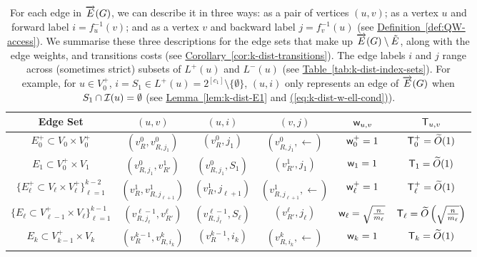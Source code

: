 \documentclass{article}
\newcommand{\eq}[1]{\hyperref[eq:#1]{(\ref*{eq:#1})}}
\newcommand{\lem}[1]{\hyperref[lem:#1]{Lemma~\ref*{lem:#1}}}
\newcommand{\cor}[1]{\hyperref[cor:#1]{Corollary~\ref*{cor:#1}}}
\newcommand{\tabl}[1]{\hyperref[tab:#1]{Table~\ref*{tab:#1}}}
\newcommand{\defin}[1]{\hyperref[def:#1]{Definition~\ref*{def:#1}}}
\renewcommand{\>}{\rangle}
\newcommand{\<}{\langle}
\renewcommand{\(}{\left(}
\renewcommand{\)}{\right)}
\def\w{{\sf w}}
\begin{document}
\begin{table}
	\renewcommand{\arraystretch}{1.5}
	\centering
	\begin{tabular}{ |c|c|c|c|c|c| }
		\hline
		Edge Set & $(u,v)$ & $(u,i)$ & $(v,j)$ & $\w_{u,v}$ & ${\sf T}_{u,v}$\\
		\hline
		\hline
		$E_0^+\subset V_0\times V_0^+$ & $(v^0_R,v^0_{R,j_1})$ & $(v^0_R,j_1)$ & $(v^0_{R,j_1},\leftarrow) $  & $\w_0^+=1$ & ${\sf T}_0^+=\widetilde{O}(1)$\\
		\hline
		$E_1\subset V_0^+\times V_1$ & $(v^0_{R,j_1},v^1_{R'})$ & $(v^0_{R,j_1},S_1)$ & $(v^1_{R'},j_1) $  & $\w_1=1$ & ${\sf T}_1=\widetilde{O}(1)$\\
		\hline
		$\{E_\ell^+\subset V_{\ell}\times V_{\ell}^+\}_{\ell=1}^{k-2}$ & $(v^1_{R},v^1_{R,j_{\ell+1}})$ & $(v^1_{R},j_{\ell+1})$ & $(v^1_{R,j_{\ell+1}},\leftarrow)$  & $\w_{\ell}^+=1$ & ${\sf T}_{\ell}^+=\widetilde{O}(1)$\\
		\hline
		$\{E_\ell\subset V_{\ell-1}^+\times V_{\ell}\}_{\ell=1}^{k-1}$ & $(v^{\ell-1}_{R,j_{\ell}},v^{\ell}_{R'})$ & $(v^{\ell-1}_{R,j_{\ell}},S_{\ell})$ & $(v^{\ell}_{R'},j_{\ell})$  & $\w_{\ell}=\sqrt{\frac{n}{m_{\ell}}}$ & ${\sf T}_{\ell}=\widetilde{O}\left(\sqrt{\frac{n}{m_{\ell}}}\right)$\\
		\hline
		$E_k\subset V_{k-1}^+\times V_k$ & $(v^{k-1}_{R},v^k_{R,i_k})$ & $(v^{k-1}_{R},i_k)$ & $(v^k_{R,i_k},\leftarrow)$  & $\w_k=1$ & ${\sf T}_k=\widetilde{O}(1)$\\
		\hline
	\end{tabular}
	\caption{
For each edge in $\protect\overrightarrow{E}(G)$, we can describe it in three ways: as a pair of vertices $(u,v)$; as a vertex $u$ and forward label $i=f_u^{-1}(v)$; and as a vertex $v$ and backward label $j=f_v^{-1}(u)$ (see \defin{QW-access}). We summarise these three descriptions for the edge sets that make up $\protect\overrightarrow{E}(G)\setminus\tilde{E}$, along with the edge weights, and transitions costs (see \cor{k-dist-transitions}). The edge labels $i$ and $j$ range across (sometimes strict) subsets of $L^+(u)$ and $L^-(u)$ (see \tabl{k-dist-index-sets}). For example, for $u\in V_0^+$, $i=S_1\in L^+(u)=2^{[c_1]}\setminus\{\emptyset\}$, $(u,i)$ only represents an edge of $\protect\overrightarrow{E}(G)$ when $S_1\cap {\cal I}(u)=\emptyset$ (see \lem{k-dist-E1} and \eq{k-dist-w-ell-cond}).}\label{tab:k-dist-edges}
\end{table}
\end{document}
